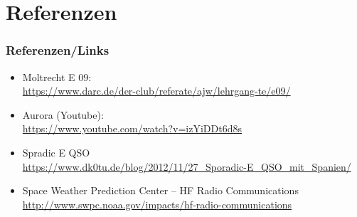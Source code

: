 


\section*{Referenzen}

\begin{frame}
  \frametitle{Referenzen/Links}

  \footnotesize
  \begin{itemize}
    \item Moltrecht E 09: \\
      \url{https://www.darc.de/der-club/referate/ajw/lehrgang-te/e09/}
    \item Aurora (Youtube): \\
      \url{https://www.youtube.com/watch?v=izYiDDt6d8s}
    \item Spradic E QSO \\
      \url{https://www.dk0tu.de/blog/2012/11/27_Sporadic-E_QSO_mit_Spanien/}
    \item Space Weather Prediction Center -- HF Radio Communications \\
      \url{http://www.swpc.noaa.gov/impacts/hf-radio-communications}
  \end{itemize}

\end{frame}


